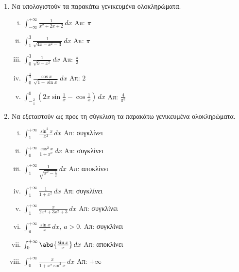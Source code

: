 


\everymath{\displaystyle}



\begin{center}
  \minibox{\large\bfseries \textcolor{Col1}{Γενικευμένα  Ολοκληρώματα}}
\end{center}

\vspace{\baselineskip}

\begin{enumerate}
  \item Να υπολογιστούν τα παρακάτω γενικευμένα ολοκληρώματα.
    \begin{enumerate}[i)]
      \item $ \int _{-\infty}^{+\infty} \frac{1}{x^{2}+2x+2} \,{dx} $
        \hfill Απ: $ \pi $
      \item $ \int _{1}^{3} \frac{1}{\sqrt{4x-x^{2}-3}} \,{dx} $ \hfill
        Απ: $ \pi $
      \item $ \int _{0}^{3} \frac{1}{\sqrt{9-x^{2}}} \,{dx} $ \hfill Απ: $
        \frac{\pi}{2} $
      \item $ \int _{0}^{\frac{\pi}{2}} \frac{\cos{x}}{\sqrt{1 - \sin{x}}}\,{dx} $
        \hfill Απ: $ 2 $
      \item $ \int_{-\frac{2}{\pi}}^{0} \left(2x \sin{\frac{1}{x}} - 
        \cos{\frac{1}{x}}\right) \,{dx} $ \hfill Απ: $ \frac{4}{\pi ^{2}} $
    \end{enumerate}

  \item Να εξεταστούν ως προς τη σύγκλιση τα παρακάτω γενικευμένα
    ολοκληρώματα.
    \begin{enumerate}[i)]
      \item $ \int_{1}^{+\infty} \frac{\sin^{2}{x}}{x^{2}} \,{dx} $ 
        \hfill Απ: συγκλίνει
      \item $ \int _{0}^{+\infty} \frac{\cos^{2}{x}}{1+x^{2}} \,{dx} $
        \hfill Απ: συγκλίνει
      \item $ \int_{1}^{+\infty} \frac{1}{\sqrt{x^{2} - \frac{1}{2}}} \,{dx}  $
        \hfill Απ: αποκλίνει
      \item $ \int_{1}^{+\infty} \frac{1}{1+x^{2}} \,{dx} $ \hfill Απ: συγκλίνει
      \item $ \int _{1}^{+\infty} \frac{x}{2x^{4}+3x^{2}+3} \,{dx} $
        \hfill Απ: συγκλίνει
      \item $ \int _{a}^{+\infty} \frac{\sin{x}}{x} \,{dx}$, $ a>0 $.
        \hfill Απ: συγκλίνει
      \item $ \int _{0}^{+\infty}	\abs{\frac{\sin{x}}{x}} \,{dx} $ \hfill
        Απ: αποκλίνει
      \item $ \int _{0}^{+\infty} \frac{x}{1+x^{2} \sin^{2}{x}}  \,{dx} $
        \hfill Απ: $ +\infty $
    \end{enumerate}


\end{enumerate}
